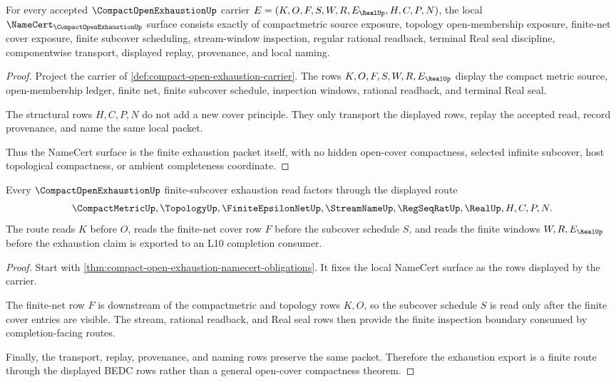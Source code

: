 \begin{theorem}
\label{thm:compact-open-exhaustion-namecert-obligations}
For every accepted $\CompactOpenExhaustionUp$ carrier $E=(K,O,F,S,W,R,E_{\RealUp},H,C,P,N)$, the local $\NameCert_{\CompactOpenExhaustionUp}$ surface consists exactly of compactmetric source exposure, topology open-membership exposure, finite-net cover exposure, finite subcover scheduling, stream-window inspection, regular rational readback, terminal Real seal discipline, componentwise transport, displayed replay, provenance, and local naming.
\end{theorem}
\begin{proof}
Project the carrier of \autoref{def:compact-open-exhaustion-carrier}. The rows $K,O,F,S,W,R,E_{\RealUp}$ display the compact metric source, open-membership ledger, finite net, finite subcover schedule, inspection windows, rational readback, and terminal Real seal.

The structural rows $H,C,P,N$ do not add a new cover principle. They only transport the displayed rows, replay the accepted read, record provenance, and name the same local packet.

Thus the NameCert surface is the finite exhaustion packet itself, with no hidden open-cover compactness, selected infinite subcover, host topological compactness, or ambient completeness coordinate.
\end{proof}

\begin{theorem}
\label{thm:compact-open-exhaustion-finite-subcover-route}
Every $\CompactOpenExhaustionUp$ finite-subcover exhaustion read factors through the displayed route
$$
\CompactMetricUp,\TopologyUp,\FiniteEpsilonNetUp,\StreamNameUp,\RegSeqRatUp,\RealUp,H,C,P,N .
$$
The route reads $K$ before $O$, reads the finite-net cover row $F$ before the subcover schedule $S$, and reads the finite windows $W,R,E_{\RealUp}$ before the exhaustion claim is exported to an L10 completion consumer.
\end{theorem}
\begin{proof}
Start with \autoref{thm:compact-open-exhaustion-namecert-obligations}. It fixes the local NameCert surface as the rows displayed by the carrier.

The finite-net row $F$ is downstream of the compactmetric and topology rows $K,O$, so the subcover schedule $S$ is read only after the finite cover entries are visible. The stream, rational readback, and Real seal rows then provide the finite inspection boundary consumed by completion-facing routes.

Finally, the transport, replay, provenance, and naming rows preserve the same packet. Therefore the exhaustion export is a finite route through the displayed BEDC rows rather than a general open-cover compactness theorem.
\end{proof}

